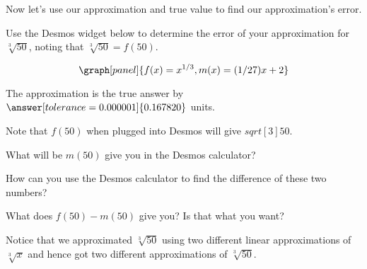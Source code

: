 \documentclass[handout,nooutcomes]{ximera}
\begin{document}
\begin{example}
\begin{explanation}
Now let's use our approximation and true value to find our approximation's error.

Use the Desmos widget below to determine the error of your approximation for $\sqrt[3]{50}$, noting that $\sqrt[3]{50} = f(50)$.

\[
\graph[panel]{f(x) = x^{1/3}, m(x) = (1/27) x + 2}
\]

\begin{question}
The approximation is  the true 
answer by $\answer[tolerance=0.000001]{0.167820}$ units.

\begin{hint}
Note that $f(50)$ when plugged into Desmos will give $
sqrt[3]{50}$.
\end{hint}
\begin{hint}
What will be $m(50)$ give you in the Desmos calculator?
\end{hint}
\begin{hint}
How can you use the Desmos calculator to find the difference of these two numbers?
\end{hint}
\begin{hint}
What does $f(50)-m(50)$ give you? Is that what you want?
\end{hint}
\end{question}


\end{explanation}
\end{example}

Notice that we approximated $\sqrt[3]{50}$ using two different linear approximations of $\sqrt[3]{x}$ and hence got two different approximations of $\sqrt[3]{50}$.
\end{document}
